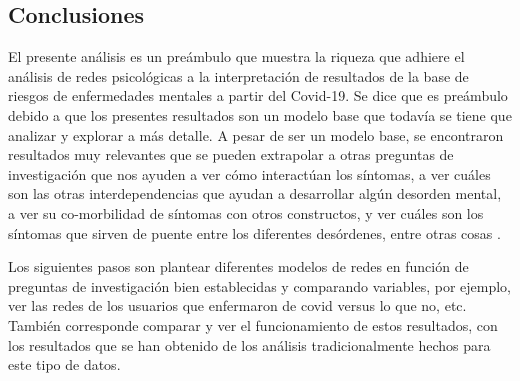 \documentclass[11pt,spanish]{article}\usepackage[]{graphicx}\usepackage[]{color}
\begin{document}
\clearpage

\subsection{Conclusiones}

El presente análisis es un preámbulo que muestra la riqueza que adhiere el análisis de redes psicológicas a la interpretación de resultados de la base de riesgos de enfermedades mentales a partir del Covid-19. Se dice que es preámbulo debido a que los presentes resultados son un modelo base que todavía se tiene que analizar y explorar a más detalle. A pesar de ser un modelo base, se encontraron resultados muy relevantes que se pueden extrapolar a otras preguntas de investigación que nos ayuden a ver cómo interactúan los síntomas, a ver cuáles son las otras interdependencias que ayudan a desarrollar algún desorden mental, a ver su co-morbilidad de síntomas con otros constructos, y ver cuáles son los síntomas que sirven de puente entre los diferentes desórdenes, entre otras cosas \citep{fried2017mental, haslbeck2017predictable}.

Los siguientes pasos son plantear diferentes modelos de redes en función de preguntas de investigación bien establecidas y comparando variables, por ejemplo, ver las redes de los usuarios que enfermaron de covid versus lo que no, etc. También corresponde comparar y ver el funcionamiento de estos resultados, con los resultados que se han obtenido de los análisis tradicionalmente hechos para este tipo de datos.
\end{document}
